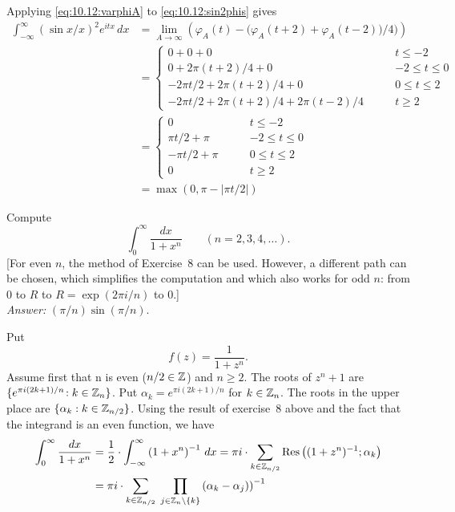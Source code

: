 \begin{enumerate}
Applying \eqref{eq:10.12:varphiA} %
to \eqref{eq:10.12:sin2phis} gives
\begin{align*}
\int_{-\infty}^\infty (\sin x/x)^2 e^{itx}\,dx
&= \lim_{A\to\infty} 
   \left(\varphi_A(t) -\bigl(\varphi_A(t+2) + \varphi_A(t-2)\bigr)/4)
   \right)\\
&= \left\{\begin{array}{ll}%
   0 + 0 + 0  \qquad & t \leq -2 \\
   0 + 2\pi(t+2)/4 + 0 \qquad & -2 \leq t \leq 0 \\
   -2\pi t/2 + 2\pi(t+2)/4 + 0 \qquad & 0 \leq t \leq 2 \\
   -2\pi t/2 + 2\pi(t+2)/4 + 2\pi(t-2)/4 \qquad & t \geq 2
   \end{array}\right. \\
&= \left\{\begin{array}{ll}%
   0  \qquad & t \leq -2 \\
   \pi t/2+\pi \qquad & -2 \leq t \leq 0 \\
   -\pi t/2 + \pi \qquad & 0 \leq t \leq 2 \\
   0 \qquad & t \geq 2
   \end{array}\right. \\
&= \max\left(0, \pi-|\pi t/2|\right)
\end{align*}

\begin{excopy}
Compute
\begin{equation*}
\int_0^\infty \frac{dx}{1 + x^n} \qquad (n=2,3,4,\ldots).
\end{equation*}
[For even $n$, the method of Exercise~8 can be used.
However, a different path can be chosen, which simplifies the computation
and which also works for odd $n$:
from $0$ to $R$ to \(R = \exp(2\pi i/n)\) to $0$.]
\\
\phantom{AAAA}\emph{Answer:} \((\pi/n)\sin(\pi/n)\).
\end{excopy}

Put 
\begin{equation*}
f(z) = \frac{1}{1 + z^n}.
\end{equation*}
Assume first that n is even (\(n/2\in\mathbb{Z}\)) and \(n\geq 2\).
The roots of \(z^n+1\) are \mbox{\(\{e^{\pi i(2k+1)/n}\!: k\in \mathbb{Z}_n\}\)}.
Put \(\alpha_k = e^{\pi i(2k+1)/n}\) for \(k\in\mathbb{Z}_n\).
The roots in the upper place are
 \(\{\alpha_k: k\in \mathbb{Z}_{n/2}\}\).
Using the result of exercise~8 above and the fact that the integrand is 
an even function, we have
\begin{align*}
\int_0^\infty \frac{dx}{1 + x^n}
&= \frac{1}{2}\cdot \int_{-\infty}^\infty \left(1 + x^n\right)^{-1}\,dx
 = \pi i \cdot \sum_{k\in\mathbb{Z}_{n/2}} 
        \mathop{\rm Res}\nolimits\left( (1 + z^n)^{-1}; \alpha_k \right) \\
&= \pi i \cdot \sum_{k\in\mathbb{Z}_{n/2}}\; 
      \prod_{j\in \mathbb{Z}_n\setminus\{k\}} \left(\alpha_k - \alpha_j)\right)^{-1}
\end{align*}


\end{enumerate}
